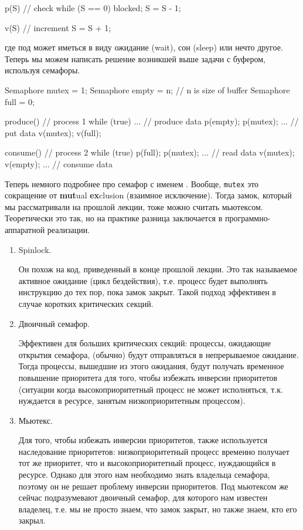 \begin{ccode}
  p(S) { // check
    while (S == 0) blocked;
    S = S - 1;
  }

  v(S) { // increment
    S = S + 1;
  }
\end{ccode}

где под  может иметься в виду ожидание (wait), сон (sleep) или
нечто другое. Теперь мы можем написать решение возникшей выше задачи с буфером,
используя семафоры.

\begin{ccode}
  Semaphore mutex = 1;
  Semaphore empty = n; // n is size of buffer
  Semaphore full = 0;
  
  produce() { // process 1
    while (true) {
      ... // produce data
      p(empty);
      p(mutex);
      ... // put data
      v(mutex);
      v(full);
    }
  }

  consume() { // process 2
    while (true) {
      p(full);
      p(mutex);
      ... // read data
      v(mutex);
      v(empty);
      ... // consume data
    }
  }
\end{ccode}

Теперь немного подробнее про семафор с именем . Вообще,
\texttt{mutex} это сокращение от \textbf{mut}ual \textbf{ex}clusion (взаимное
исключение). Тогда замок, который мы рассматривали на прошлой лекции, тоже можно
считать мьютексом. Теоретически это так, но на практике разница заключается в
программно-аппаратной реализации.

\begin{enumerate}
\item
  Spinlock.

  Он похож на код, приведенный в конце прошлой лекции. Это так называемое
  активное ожидание (цикл бездействия), т.е. процесс будет выполнять инструкцию
   до тех пор, пока замок закрыт. Такой подход эффективен
  в случае коротких критических секций.

\item
  Двоичный семафор.

  Эффективен для больших критических секций: процессы, ожидающие открытия
  семафора, (обычно) будут отправляться в непрерываемое ожидание. Тогда
  процессы, вышедшие из этого ожидания, будут получать временное повышение
  приоритета для того, чтобы избежать инверсии приоритетов (ситуации когда
  высокоприоритетный процесс не может исполняться, т.к. нуждается в ресурсе,
  занятым низкоприоритетным процессом).

\item
  Мьютекс.

  Для того, чтобы избежать инверсии приоритетов, также используется наследование
  приоритетов: низкоприоритетный процесс временно получает тот же приоритет, что
  и высокоприоритетный процесс, нуждающийся в ресурсе. Однако для этого нам
  необходимо знать владельца семафора, поэтому он не решает проблему инверсии
  приоритетов. Под мьютексом же сейчас подразумевают двоичный семафор, для
  которого нам известен владелец, т.е. мы не просто знаем, что замок закрыт, но
  также знаем, кто его закрыл.
\end{enumerate}

